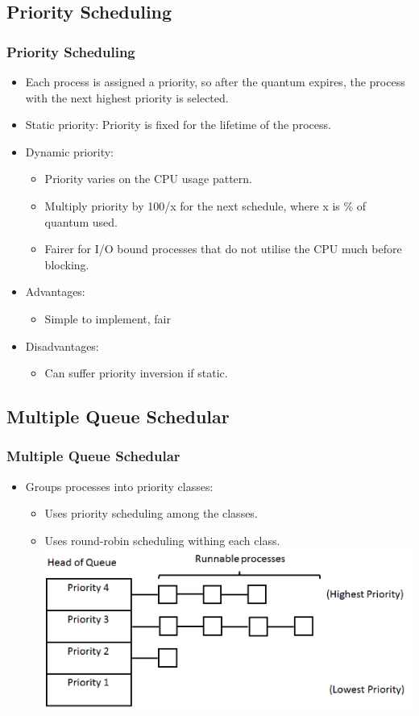 \documentclass{beamer}
\begin{document}
\subsection{Priority Scheduling}
\begin{frame}
\frametitle{Priority Scheduling}
\begin{itemize}
\item Each process is assigned a priority, so after the quantum expires, the process with the next highest priority is selected.
\item Static priority: Priority is fixed for the lifetime of the process.
\item Dynamic priority: 
\begin{itemize}
\item Priority varies on the CPU usage pattern.
\item Multiply priority by 100/x for the next schedule, where x is \% of quantum used.
\item Fairer for I/O bound processes that do not utilise the CPU much before blocking.
\end{itemize}
\item Advantages:
\begin{itemize}
\item Simple to implement, fair
\end{itemize}
\item Disadvantages:
\begin{itemize}
\item Can suffer priority inversion if static.
\end{itemize}
\end{itemize}
\end{frame}
\subsection{Multiple Queue Schedular}
\begin{frame}
\frametitle{Multiple Queue Schedular}
\begin{itemize}
\item Groups processes into priority classes:
\begin{itemize}
\item Uses priority scheduling among the classes.
\item Uses round-robin scheduling withing each class.
\includegraphics[scale=0.3]{mult.png}
\end{itemize}
\end{itemize}
\end{frame}
\end{document}
